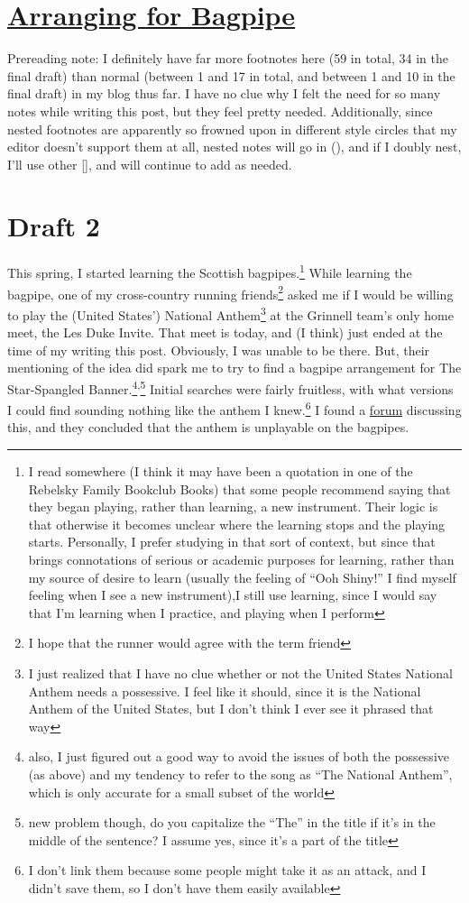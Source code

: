 \documentclass[12pt]{article}[titlepage]
\newcommand{\say}[1]{``#1''}
\newcommand{\1}{\={a}}
\newcommand{\2}{\={e}}
\newcommand{\3}{\={\i}}
\newcommand{\4}{\=o}
\newcommand{\5}{\=u}
\newcommand{\6}{\={A}}
\renewcommand{\,}{\textsuperscript{,}}
\begin{document}
\doublespacing

\section{\href{arranging-for-bagpipe.html}{Arranging for Bagpipe}}
Prereading note: I definitely have far more footnotes here (59 in total, 34 in the final draft) than normal (between 1 and 17 in total, and between 1 and 10 in the final draft) in my blog thus far. I have no clue why I felt the need for so many notes while writing this post, but they feel pretty needed.
Additionally, since nested footnotes are apparently so frowned upon in different style circles that my editor doesn't support them at all, nested notes will go in (), and if I doubly nest, I'll use other [], and will continue to add as needed.
\section{Draft 2}
This spring, I started learning the Scottish bagpipes.\footnote{I read somewhere (I think it may have been a quotation in one of the Rebelsky Family Bookclub Books) that some people recommend saying that they began playing, rather than learning, a new instrument. Their logic is that otherwise it becomes unclear where the learning stops and the playing starts. Personally, I prefer studying in that sort of context, but since that brings connotations of serious or academic purposes for learning, rather than my source of desire to learn (usually the feeling of \say{Ooh Shiny!} I find myself feeling when I see a new instrument),I still use learning, since I would say that I'm learning when I practice, and playing when I perform}
While learning the bagpipe, one of my cross-country running friends\footnote{I hope that the runner would agree with the term friend} asked me if I would be willing to play the (United States') National Anthem\footnote{I just realized that I have no clue whether or not the United States National Anthem needs a possessive. I feel like it should, since it is the National Anthem of the United States, but I don't think I ever see it phrased that way} at the Grinnell team's only home meet, the Les Duke Invite.
That meet is today, and (I think) just ended at the time of my writing this post.
Obviously, I was unable to be there.
But, their mentioning of the idea did spark me to try to find a bagpipe arrangement for The Star-Spangled Banner.\footnote{also, I just figured out a good way to avoid the issues of both the possessive (as above) and my tendency to refer to the song as \say{The National Anthem}, which is only accurate for a small subset of the world}\,\footnote{new problem though, do you capitalize the \say{The} in the title if it's in the middle of the sentence? I assume yes, since it's a part of the title}
Initial searches were fairly fruitless, with what versions I could find sounding nothing like the anthem I knew.\footnote{I don't link them because some people might take it as an attack, and I didn't save them, so I don't have them easily available}
I found a \href{http://www.therealviperpiper.com/viewtopic.php?t=11731}{forum} discussing this, and they concluded that the anthem is unplayable on the bagpipes.
\end{document}
